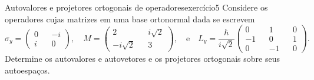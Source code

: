 \begin{exercício}{Autovalores e projetores ortogonais de operadores}{exercício5}
    Considere os operadores cujas matrizes em uma base ortonormal dada se escrevem
    \begin{equation*}
        \sigma_y = \begin{pmatrix}
            0 && -i\\
            i && 0
        \end{pmatrix},
        \quad
        M = \begin{pmatrix}
            2 && i \sqrt{2}\\
            -i \sqrt{2} && 3
        \end{pmatrix},
        \quad\text{e}\quad
        L_y = \frac{\hbar}{i\sqrt{2}}\begin{pmatrix}
            0 && 1 && 0\\
            -1&& 0 && 1\\
            0 && -1&& 0
        \end{pmatrix}.
    \end{equation*}
    Determine os autovalores e autovetores e os projetores ortogonais sobre seus autoespaços.
\end{exercício}
